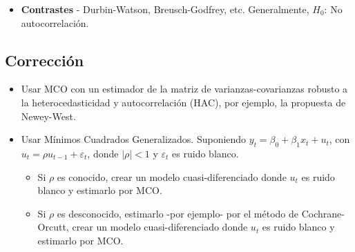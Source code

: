 \documentclass[10pt, a4paper, landscape]{article}
\begin{document}
\begin{multicols}{3}
\begin{itemize}[leftmargin=*]
			\item \textbf{Contrastes} - Durbin-Watson, Breusch-Godfrey, etc. Generalmente, $H_{0}$: No autocorrelación.
		\end{itemize}
		
		\subsection*{Corrección}
		
		\begin{itemize}[leftmargin=*]
			\item Usar MCO con un estimador de la matriz de varianzas-covarianzas robusto a la heterocedasticidad y autocorrelación (HAC), por ejemplo, la propuesta de Newey-West.
			\item Usar Mínimos Cuadrados Generalizados. Suponiendo $y_{t} = \beta_{0} + \beta_{1} x_{t} + u_{t}$, con $u_{t} = \rho u_{t - 1} + \varepsilon_{t}$, donde $\lvert \rho \rvert < 1$ y $\varepsilon_{t}$ es ruido blanco.
			
			\begin{itemize}[leftmargin=*]
				\item Si $\rho$ es conocido, crear un modelo cuasi-diferenciado donde $u_{t}$ es ruido blanco y estimarlo por MCO.
				\item Si $\rho$ es desconocido, estimarlo -por ejemplo- por el método de Cochrane-Orcutt, crear un modelo cuasi-diferenciado donde $u_{t}$ es ruido blanco y estimarlo por MCO.
			\end{itemize}
		\end{itemize}
	\end{multicols}
\end{document}
